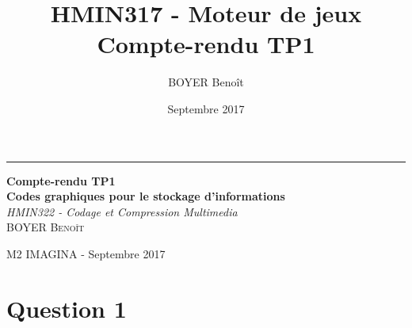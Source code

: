 \documentclass[a4paper,11pt]{report}
\title{HMIN317 - Moteur de jeux \\ Compte-rendu TP1}
\author{BOYER Benoît}
\date{Septembre 2017}
\begin{document}
  \begin{titlepage} %
	
	  \raggedleft %
	
	  \rule{1pt}{\textheight} %
	  \hspace{0.05\textwidth} %
	  \parbox[b]{0.75\textwidth}{ %
		
		  {\Huge\bfseries Compte-rendu TP1 \\[0.5\baselineskip] Codes graphiques pour le stockage d'informations}\\[2\baselineskip] %
		  {\large\textit{HMIN322 - Codage et Compression Multimedia}}\\[4\baselineskip] %
		  {\Large\textsc{BOYER Benoît}} %
		
		  \vspace{0.5\textheight} %
		
		  {\noindent M2 IMAGINA - Septembre 2017}\\[\baselineskip] %
	  }

  \end{titlepage}

    \section{Question 1}
\end{document}
